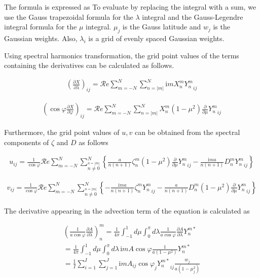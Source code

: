 The formula is expressed as To evaluate by replacing the integral with a sum, we use the Gauss trapezoidal formula for the \(\lambda\) integral and the Gauss-Legendre integral formula for the \(\mu\)
integral. \(\mu_j\) is the Gauss latitude and \(w_j\) is the Gaussian weights. Also, \(\lambda_i\) is a grid of evenly spaced Gaussian weights.

Using spectral harmonics transformation, the grid point values of the terms containing the derivatives can be calculated as follows.

\begin{eqnarray}
        \left(  \frac{\partial X}{\partial \lambda} \right)_{ij}
     =  
        {\mathcal Re} \sum_{m=-N}^{N} \sum_{n=|m|}^{N}
       \mathrm{i}m X_n^m {Y_n^m}_{ij}
\end{eqnarray}

\begin{eqnarray}
   \left( \cos\varphi \frac{\partial X}{\partial \varphi} \right)_{ij}
     =  {\mathcal Re} \sum_{m=-N}^{N} \sum_{n=|m|}^{N}
       X_n^m
       ( 1-\mu^{2} ) \frac{\partial }{\partial \mu} {Y_n^m}_{ij}
\end{eqnarray}

Furthermore, the grid point values of \(u,v\) can be obtained from the spectral components of \(\zeta\) and \(D\) as follows

\begin{eqnarray}
  u_{ij}
  = \frac{1}{\cos\varphi}
     {\mathcal Re} \sum_{m=-N}^{N}
                       \sum_{\stackrel{n=|m|}{n \neq 0}}^{N}
    \left\{
             \frac{a}{n(n+1)} \zeta_n^m
            (1-\mu^{2}) \frac{\partial{}}{\partial {\mu}} {Y_n^m}_{ij}
          -  \frac{\mathrm{i}m a}{n(n+1)} D_n^m {Y_n^m}_{ij}
    \right\}
\end{eqnarray}

\begin{eqnarray}
  v_{ij}
  = \frac{1}{\cos\varphi}
   {\mathcal Re} \sum_{m=-N}^{N}
                     \sum_{\stackrel{n=|m|}{n \neq 0}}^{N}
    \left\{
          -  \frac{\mathrm{i}m a}{n(n+1)} \zeta_n^m {Y_n^m}_{ij}
          -  \frac{a}{n(n+1)} D_n^m
            (1-\mu^{2}) \frac{\partial{}}{\partial {\mu}} {Y_n^m}_{ij}
    \right\}
\end{eqnarray}

The derivative appearing in the advection term of the equation is calculated as

\begin{eqnarray}
  \left( \frac{1}{a\cos\varphi} \frac{\partial{A}}{\partial {\lambda}} \right)_n^m
   =  \frac{1}{4 \pi}
        \int_{-1}^{1} d \mu \int_{0}^{\pi} d \lambda
          \frac{1}{a\cos\varphi} \frac{\partial{A}}{\partial {\lambda}} Y_n^{m *} \\
   =  \frac{1}{4 \pi}
        \int_{-1}^{1} d \mu \int_{0}^{\pi} d \lambda \,
          \mathrm{i}m A \cos\varphi \frac{1}{a(1-\mu^{2})} Y_n^{m *} \\
   =  \frac{1}{I} \sum_{i=1}^{I} \sum_{j=1}^{J}  
          \mathrm{i}m A_{ij} \cos\varphi_j
          {Y_n^{m *}}_{ij} \frac{w_j}{a(1-\mu_j^{2})}
\end{eqnarray}

